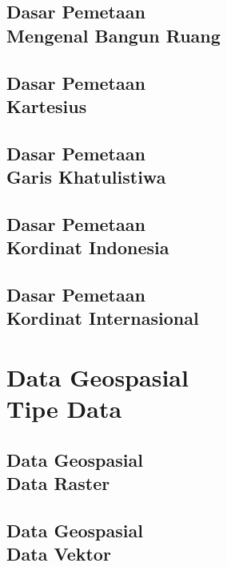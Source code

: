 \documentclass{WileySix}
\begin{document}
\chapter[Mengenal Bangun Ruang]
{Dasar Pemetaan\\ Mengenal Bangun Ruang}


\chapter[Mengenal Diagram Kartesius]
{Dasar Pemetaan\\ Kartesius}


\chapter[Garis Khatulistiwa]
{Dasar Pemetaan\\ Garis Khatulistiwa}


\chapter[Kordinat Indonesia]
{Dasar Pemetaan\\ Kordinat Indonesia}


\chapter[Kordinat Internasional]
{Dasar Pemetaan\\ Kordinat Internasional}



\part[Data Geospasial]
{Data Geospasial\\ Tipe Data}


\chapter[Data Raster]
{Data Geospasial\\ Data Raster}



\chapter[Data Vektor]
{Data Geospasial\\ Data Vektor}

\end{document}

